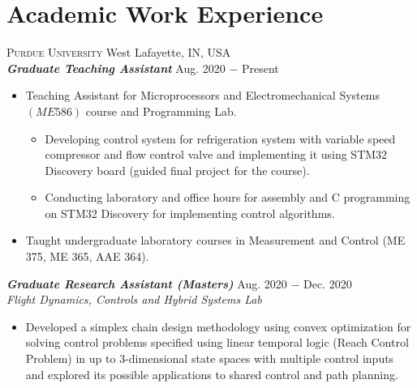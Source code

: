 \documentclass[letterpaper,10pt]{article}
\begin{document}
\section{Academic Work Experience}
\noindent \textsc{Purdue University} \hfill West Lafayette, IN, USA \\
\vspace{3pt}
\noindent \textbf{\textit{Graduate Teaching Assistant}} \hfill Aug. 2020 $-$ Present\\
\begin{itemize}[noitemsep,nolistsep,leftmargin=0.25in,label={--}]
\item Teaching Assistant for Microprocessors and Electromechanical Systems $(ME
586)$ course and Programming Lab.
    \begin{itemize}
\item Developing control system for refrigeration system with variable speed
compressor and flow control valve and implementing it using STM32 Discovery
board (guided final project for the course).
\item Conducting laboratory and office hours for assembly and C programming on
STM32 Discovery for implementing control algorithms.
    \end{itemize}
\item Taught undergraduate laboratory courses in Measurement and Control (ME
375, ME 365, AAE 364).
\end{itemize}
\vspace{3pt}
\noindent \textbf{\textit{Graduate Research Assistant (Masters)}} \hfill Aug. 2020 $-$ Dec. 2020\\
\textit{Flight Dynamics, Controls and Hybrid Systems Lab}
\begin{itemize}[noitemsep,nolistsep,leftmargin=0.25in,label={--}]
	\item Developed a simplex chain design methodology using convex optimization for solving control problems specified using linear temporal logic (Reach Control Problem) in up to 3-dimensional state spaces with multiple control inputs and explored its possible applications to shared control and path planning.
\end{itemize}



\end{document}
